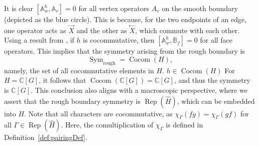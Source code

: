 \documentclass[a4paper,11pt]{article}
\theoremstyle{theorem}
\theoremstyle{remark}
\newcommand{\Av}{\mathbb{A}}
\newcommand{\Bf}{\mathbb{B}}
\newcommand{\XR}{\overset{\rightarrow}{X}}
\newcommand{\XL}{\overset{\leftarrow}{X}}
\begin{document}
It is clear $[\Av_w^h, \Av_v] = 0$ for all vertex operators $A_v$ on the smooth boundary (depicted as the blue circle). This is because, for the two endpoints of an edge, one operator acts as $\XR$ and the other as $\XL$, which commute with each other. 
Using a result from \cite[Corollary 1]{chang2014kitaev}, if $h$ is cocommutative, then $[\Av_w^h, \Bf_f] = 0$ for all face operators. This implies that the symmetry arising from the rough boundary is 
\begin{equation}
    \operatorname{Sym}_{\mathrm{rough}} = \operatorname{Cocom}(H),
\end{equation}
namely, the set of all cocommutative elements in $H$. $h\in \operatorname{Cocom}(H)$
For $H = \mathbb{C}[G]$, it follows that $\operatorname{Cocom}(\mathbb{C}[G]) = \mathbb{C}[G]$, and thus the symmetry is $\mathbb{C}[G]$. This conclusion also aligns with a macroscopic perspective, where we assert that the rough boundary symmetry is $\operatorname{Rep}(\hat{H})$, which can be embedded into $H$. Note that all characters are cocommutative, as $\chi_\Gamma(fg) = \chi_\Gamma(gf)$ for all $\Gamma \in \operatorname{Rep}(\hat{H})$. Here, the comultiplication of $\chi_\Gamma$ is defined in Definition~\ref{def:pairingDef}.
\end{document}
